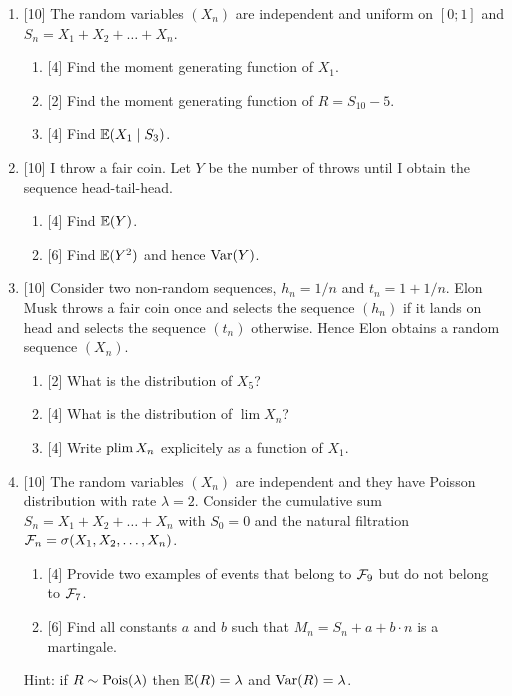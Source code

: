 \begin{enumerate}
    

    \item {[10]} The random variables $(X_n)$ are independent and uniform on $[0;1]$ and $S_n = X_1 + X_2 + \dots + X_n$.
    \begin{enumerate}
        \item {[4]} Find the moment generating function of $X_1$.
        \item {[2]} Find the moment generating function of $R = S_{10} - 5$.
        \item {[4]} Find $\operatorname{\mathbb{E}}(X_1 \mid S_3)$.
    \end{enumerate}

    \newpage

    \item {[10]} I throw a fair coin. 
    Let $Y$ be the number of throws until I obtain the sequence head-tail-head. 

    \begin{enumerate}
        \item {[4]} Find $\operatorname{\mathbb{E}}(Y)$.
        \item {[6]} Find $\operatorname{\mathbb{E}}(Y^2)$ and hence $\operatorname{Var}(Y)$.
    \end{enumerate}


    \item {[10]} Consider two non-random sequences, $h_n = 1/n$ and $t_n = 1 + 1/n$.
    Elon Musk throws a fair coin once and selects the sequence $(h_n)$ if it lands on head and selects the sequence $(t_n)$ otherwise.
    Hence Elon obtains a random sequence $(X_n)$.

    \begin{enumerate}
        \item {[2]} What is the distribution of $X_5$?
        \item {[4]} What is the distribution of $\lim X_n$?
        \item {[4]} Write $\operatorname*{plim} X_n$ explicitely as a function of $X_1$.
    \end{enumerate}
    
    \item {[10]} The random variables $(X_n)$ are independent and they have Poisson distribution with rate $\lambda = 2$. 
    Consider the cumulative sum $S_n = X_1 + X_2 + \dots + X_n$ with $S_0 = 0$
    and the natural filtration $\mathcal{F}_n = \sigma(X_1, X_2, \dots, X_n)$.

    \begin{enumerate}
        \item {[4]} Provide two examples of events that belong to $\mathcal{F}_9$ but do not belong to $\mathcal{F}_7$.
        \item {[6]} Find all constants $a$ and $b$ such that $M_n = S_n + a + b \cdot n$ is a martingale. 
    \end{enumerate}

    Hint: if $R \sim \mathrm{Pois}(\lambda)$ then $\operatorname{\mathbb{E}}(R) = \lambda$ and $\operatorname{Var}(R) = \lambda$. 

\end{enumerate}



